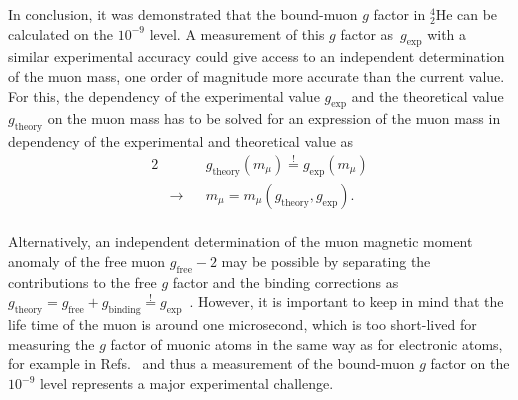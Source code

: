 \clearpage
In conclusion, it was demonstrated that the bound-muon $g$ factor in $^4_2$He can be calculated on the $10^{-9}$ level. A measurement of this $g$ factor as~$g_{\text{exp}}$ with a similar experimental accuracy could give access to an independent determination of the muon mass, one order of magnitude more accurate than the current value. 
For this, the dependency of the experimental value $g_{\text{exp}}$ and the theoretical value $g_{\text{theory}}$ on the muon mass has to be solved for an expression of the muon mass in dependency of the experimental and theoretical value as\\
\begin{alignat}{2}
&&&g_{\text{theory}}(m_\mu)\overset{!}{=}g_{\text{exp}}(m_\mu)\\
&\rightarrow &&m_\mu=m_\mu (g_{\text{theory}},g_{\text{exp}}).
\end{alignat}\\
 Alternatively, an independent determination of the muon magnetic moment anomaly of the free muon $g_{\text{free}}-2$ may be possible by separating the  contributions to the free $g$ factor and the binding corrections as $g_{\text{theory}}=g_{\text{free}}+g_{\text{binding}}\overset{!}{=}g_{\text{exp}}$~\cite{sikora2018}.
However, it is important to keep in mind that the life time of the muon is around one microsecond, which is too short-lived for measuring the $g$ factor of muonic atoms in the same way as for electronic atoms, for example in Refs.~\cite{Sturm2011,Sturm2014} and thus a measurement of the bound-muon $g$ factor on the $10^{-9}$ level represents a major experimental challenge.
%
%
